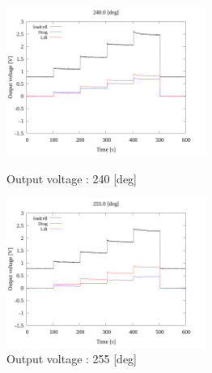\begin{figure}[htbp]
      \begin{minipage}[b]{0.45\linewidth}
        \centering
        \includegraphics[width=65mm]{../../02_workspace/result/2-1/plot/01-3_allsensors/01_allsensors_2400.png}
        \caption{Output voltage : 240 [deg]}
      \end{minipage}
      \begin{minipage}[b]{0.45\linewidth}
        \centering
        \includegraphics[width=65mm]{../../02_workspace/result/2-1/plot/01-3_allsensors/01_allsensors_2550.png}
        \caption{Output voltage : 255 [deg]}
      \end{minipage}
    \end{figure}

